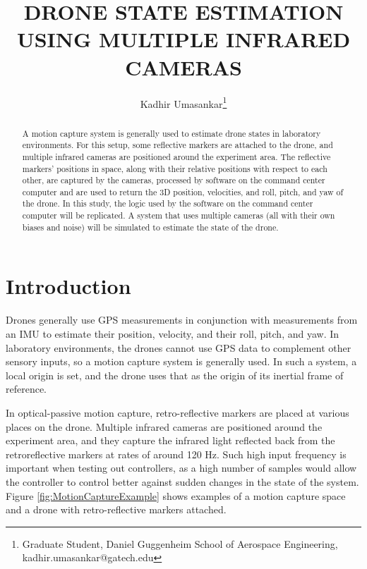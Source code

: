 \documentclass[letterpaper, paper,11pt]{AAS}	%
\begin{document}
\title{DRONE STATE ESTIMATION USING MULTIPLE INFRARED CAMERAS}

\author{Kadhir Umasankar\thanks{Graduate Student, Daniel Guggenheim School of Aerospace Engineering, kadhir.umasankar@gatech.edu}}


\maketitle{} 		


\begin{abstract}
A motion capture system is generally used to estimate drone states in laboratory environments. For this setup, some reflective markers are attached to the drone, and multiple infrared cameras are positioned around the experiment area. The reflective markers' positions in space, along with their relative positions with respect to each other, are captured by the cameras, processed by software on the command center computer and are used to return the 3D position, velocities, and roll, pitch, and yaw of the drone. In this study, the logic used by the software on the command center computer will be replicated. A system that uses multiple cameras (all with their own biases and noise) will be simulated to estimate the state of the drone.
\end{abstract}


\section{Introduction}
Drones generally use GPS measurements in conjunction with measurements from an IMU to estimate their position, velocity, and their roll, pitch, and yaw. In laboratory environments, the drones cannot use GPS data to complement other sensory inputs, so a motion capture system is generally used\cite{vicon_2022}. In such a system, a local origin is set, and the drone uses that as the origin of its inertial frame of reference.

In optical-passive motion capture, retro-reflective markers are placed at various places on the drone. Multiple infrared cameras are positioned around the experiment area, and they capture the infrared light reflected back from the retroreflective markers at rates of around 120 Hz. Such high input frequency is important when testing out controllers, as a high number of samples would allow the controller to control better against sudden changes in the state of the system. Figure \ref{fig:MotionCaptureExample} shows examples of a motion capture space and a drone with retro-reflective markers attached.
\end{document}
